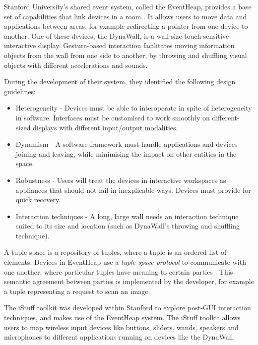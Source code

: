 Stanford University's shared event system, called the EventHeap, provides a base set of capabilities that link devices in a room \cite{Winograd2005}. It allows users to move data and applications between areas, for example redirecting a pointer from one device to another. One of these devices, the DynaWall, is a wall-size touch-sensitive interactive display. Gesture-based interaction facilitates moving information objects from the wall from one side to another, by throwing and shuffling visual objects with different accelerations and sounds.

During the development of their system, they identified the following design guidelines:

\begin{itemize}
	\item Heterogeneity - Devices must be able to interoperate in spite of heterogeneity in software. Interfaces must be customised to work smoothly on different-sized displays with different input/output modalities.
	\item Dynamism - A software framework must handle applications and devices joining and leaving, while minimising the impact on other entities in the space.
	\item Robustness - Users will treat the devices in interactive workspaces as appliances that should not fail in inexplicable ways. Devices must provide for quick recovery.
	\item Interaction techniques - A long, large wall needs an interaction technique suited to its size and location (such as DynaWall's throwing and shuffling technique).
\end{itemize}

A tuple space is a repository of tuples, where a tuple is an ordered list of elements. Devices in EventHeap use a \emph{tuple space protocol} to communicate with one another, where particular tuples have meaning to certain parties \cite{Edwards2001}. This semantic agreement between parties is implemented by the developer, for example a tuple representing a request to scan an image.

The iStuff toolkit \cite{Ballagas2003} was developed within Stanford to explore post-\ac{GUI} interaction techniques, and makes use of the EventHeap system. The iStuff toolkit allows users to map wireless input devices like buttons, sliders, wands, speakers and microphones to different applications running on devices like the DynaWall.

